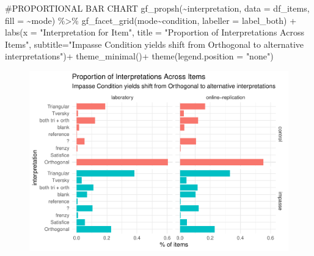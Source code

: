 \documentclass[
  letterpaper,
  DIV=11,
  numbers=noendperiod]{scrreprt}
\newenvironment{Shaded}{\begin{snugshade}}{\end{snugshade}}
\newcommand{\AttributeTok}[1]{\textcolor[rgb]{0.40,0.45,0.13}{#1}}
\newcommand{\CommentTok}[1]{\textcolor[rgb]{0.37,0.37,0.37}{#1}}
\newcommand{\FunctionTok}[1]{\textcolor[rgb]{0.28,0.35,0.67}{#1}}
\newcommand{\NormalTok}[1]{\textcolor[rgb]{0.00,0.23,0.31}{#1}}
\newcommand{\SpecialCharTok}[1]{\textcolor[rgb]{0.37,0.37,0.37}{#1}}
\newcommand{\StringTok}[1]{\textcolor[rgb]{0.13,0.47,0.30}{#1}}
\begin{document}
\begin{Shaded}
\begin{Highlighting}[]
\CommentTok{\#PROPORTIONAL BAR CHART}
\FunctionTok{gf\_propsh}\NormalTok{(}\SpecialCharTok{\textasciitilde{}}\NormalTok{interpretation, }\AttributeTok{data =}\NormalTok{ df\_items, }\AttributeTok{fill =} \SpecialCharTok{\textasciitilde{}}\NormalTok{mode) }\SpecialCharTok{\%\textgreater{}\%} 
  \FunctionTok{gf\_facet\_grid}\NormalTok{(mode}\SpecialCharTok{\textasciitilde{}}\NormalTok{condition, }\AttributeTok{labeller =}\NormalTok{ label\_both) }\SpecialCharTok{+}
  \FunctionTok{labs}\NormalTok{(}\AttributeTok{x =} \StringTok{"Interpretation for Item"}\NormalTok{,}
       \AttributeTok{title =} \StringTok{"Proportion of Interpretations Across Items"}\NormalTok{,}
       \AttributeTok{subtitle=}\StringTok{"Impasse Condition yields shift from Orthogonal to alternative interpretations"}\NormalTok{)}\SpecialCharTok{+}
  \FunctionTok{theme\_minimal}\NormalTok{()}\SpecialCharTok{+} \FunctionTok{theme}\NormalTok{(}\AttributeTok{legend.position =} \StringTok{"none"}\NormalTok{)}
\end{Highlighting}
\end{Shaded}

\begin{figure}[H]

{\centering \includegraphics{analysis/SGC3A/3_sgc3A_description_files/figure-pdf/VIS-ITEM-INTERPRETATION-1.pdf}

}

\end{figure}
\end{document}
